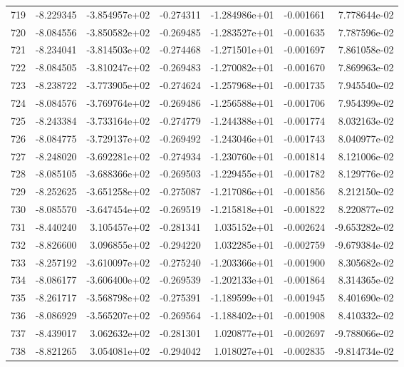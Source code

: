 \begin{tabular}{rrrrrrr}
 719 &  -8.229345 & -3.854957e+02 & -0.274311 & -1.284986e+01 &   -0.001661 &  7.778644e-02 \\
 720 &  -8.084556 & -3.850582e+02 & -0.269485 & -1.283527e+01 &   -0.001635 &  7.787596e-02 \\
 721 &  -8.234041 & -3.814503e+02 & -0.274468 & -1.271501e+01 &   -0.001697 &  7.861058e-02 \\
 722 &  -8.084505 & -3.810247e+02 & -0.269483 & -1.270082e+01 &   -0.001670 &  7.869963e-02 \\
 723 &  -8.238722 & -3.773905e+02 & -0.274624 & -1.257968e+01 &   -0.001735 &  7.945540e-02 \\
 724 &  -8.084576 & -3.769764e+02 & -0.269486 & -1.256588e+01 &   -0.001706 &  7.954399e-02 \\
 725 &  -8.243384 & -3.733164e+02 & -0.274779 & -1.244388e+01 &   -0.001774 &  8.032163e-02 \\
 726 &  -8.084775 & -3.729137e+02 & -0.269492 & -1.243046e+01 &   -0.001743 &  8.040977e-02 \\
 727 &  -8.248020 & -3.692281e+02 & -0.274934 & -1.230760e+01 &   -0.001814 &  8.121006e-02 \\
 728 &  -8.085105 & -3.688366e+02 & -0.269503 & -1.229455e+01 &   -0.001782 &  8.129776e-02 \\
 729 &  -8.252625 & -3.651258e+02 & -0.275087 & -1.217086e+01 &   -0.001856 &  8.212150e-02 \\
 730 &  -8.085570 & -3.647454e+02 & -0.269519 & -1.215818e+01 &   -0.001822 &  8.220877e-02 \\
 731 &  -8.440240 &  3.105457e+02 & -0.281341 &  1.035152e+01 &   -0.002624 & -9.653282e-02 \\
 732 &  -8.826600 &  3.096855e+02 & -0.294220 &  1.032285e+01 &   -0.002759 & -9.679384e-02 \\
 733 &  -8.257192 & -3.610097e+02 & -0.275240 & -1.203366e+01 &   -0.001900 &  8.305682e-02 \\
 734 &  -8.086177 & -3.606400e+02 & -0.269539 & -1.202133e+01 &   -0.001864 &  8.314365e-02 \\
 735 &  -8.261717 & -3.568798e+02 & -0.275391 & -1.189599e+01 &   -0.001945 &  8.401690e-02 \\
 736 &  -8.086929 & -3.565207e+02 & -0.269564 & -1.188402e+01 &   -0.001908 &  8.410332e-02 \\
 737 &  -8.439017 &  3.062632e+02 & -0.281301 &  1.020877e+01 &   -0.002697 & -9.788066e-02 \\
 738 &  -8.821265 &  3.054081e+02 & -0.294042 &  1.018027e+01 &   -0.002835 & -9.814734e-02 \\

\end{tabular}
